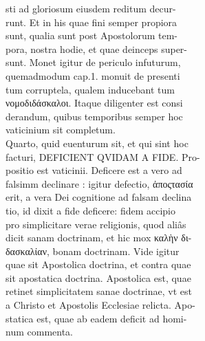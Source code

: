\documentclass{article}
\begin{document}
\begin{pages}
                sti ad gloriosum eiusdem reditum decur- \\
                runt. Et in his quae fini semper propiora \\
                sunt, qualia sunt post Apostolorum tem- \\
                pora, nostra hodie, et quae deinceps super- \\
                sunt. Monet igitur de periculo infuturum, \\
                quemadmodum cap.1. monuit de presenti \\
                tum corruptela, qualem inducebant tum \\
                νομοδιδάσκαλοι. Itaque diligenter est consi \\
                derandum, quibus temporibus semper hoc \\
                vaticinium sit completum. \\
                Quarto, quid euenturum sit, et qui sint hoc \\
                facturi, DEFICIENT QVIDAM A FIDE. Pro- \\
                positio est vaticinii. Deficere est a vero ad \\
                falsimm declinare : igitur defectio, ἀποςτασία \\
                erit, a vera Dei cognitione ad falsam declina \\
                tio, id dixit a fide deficere: fidem accipio \\
                pro simplicitare verae religionis, quod aliâs \\
                dicit sanam doctrinam, et hic mox καλὴν δι- \\
                δασκαλίαν, bonam doctrinam. Vide igitur \\
                quae sit Apostolica doctrina, et contra quae \\
                sit apostatica doctrina. Apostolica est, quae \\
                retinet simplicitatem sanae doctrinae, vt est \\
                a Christo et Apostolis Ecclesiae relicta. Apo- \\
                statica est, quae ab eadem deficit ad homi- \\
                num commenta. \\

\end{pages}
\end{document}
